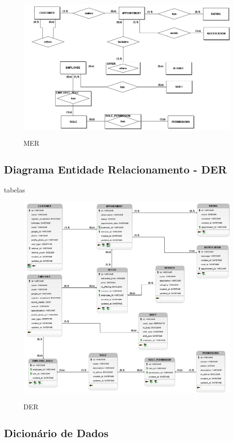 \begin{figure}[h!tbp]
	\centering
	\caption{MER}
	\includegraphics[width=1\textwidth]{cap04-desenvolvimento/images/4-7-1-modelo-entidade-relacionamento.png}
	\label{fig:mer}
\end{figure}
\subsection{Diagrama Entidade Relacionamento - DER}
tabelas
\begin{figure}[h!tbp]
	\centering
	\caption{DER}
	\includegraphics[width=1\textwidth]{cap04-desenvolvimento/images/4-7-2-diagrama-entidade-relacionamento.png}
	\label{fig:der}
\end{figure}
\subsection{Dicionário de Dados}